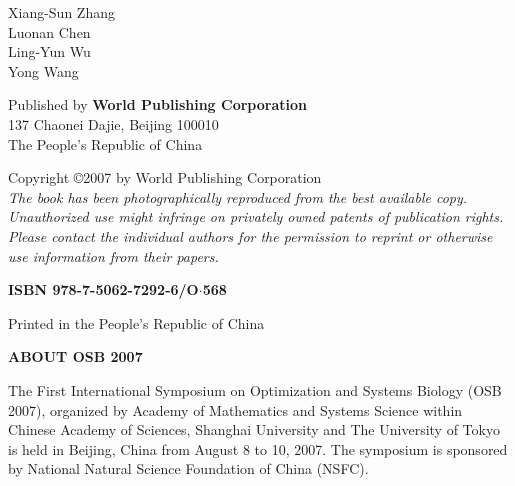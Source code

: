 \vskip 30pt


 \vskip 10pt

 \noindent
 Xiang-Sun Zhang \\
 Luonan Chen \\
 Ling-Yun Wu \\
 Yong Wang

 \vfill

 \noindent
 Published by {\bf World Publishing Corporation} \\
 137 Chaonei Dajie, Beijing 100010 \\
 The People's Republic of China

 \vskip 10pt

 \noindent
 Copyright \copyright{}2007 by World Publishing Corporation \\

 \it\noindent
 The book has been photographically reproduced from the best
 available copy. Unauthorized use might infringe on privately owned
 patents of publication rights. Please contact the individual
 authors for the permission to reprint or otherwise use information
 from their papers.

 \vskip 10pt

 \bf\noindent
 ISBN 978-7-5062-7292-6/O$\cdot$568

 \vskip 10pt

 \rm\noindent
 Printed in the People's Republic of China



 \newpage
 \normalfont\normalsize

 \centerline{\bf\Large ABOUT OSB 2007}

 \bigskip


 \medskip

 \noindent
The First International Symposium on Optimization and Systems
Biology (OSB 2007), organized by Academy of Mathematics and Systems
Science within Chinese Academy of Sciences, Shanghai University and
The University of Tokyo is held in Beijing, China from August 8 to
10, 2007. The symposium is sponsored by National Natural Science
Foundation of China (NSFC).

 \medskip

